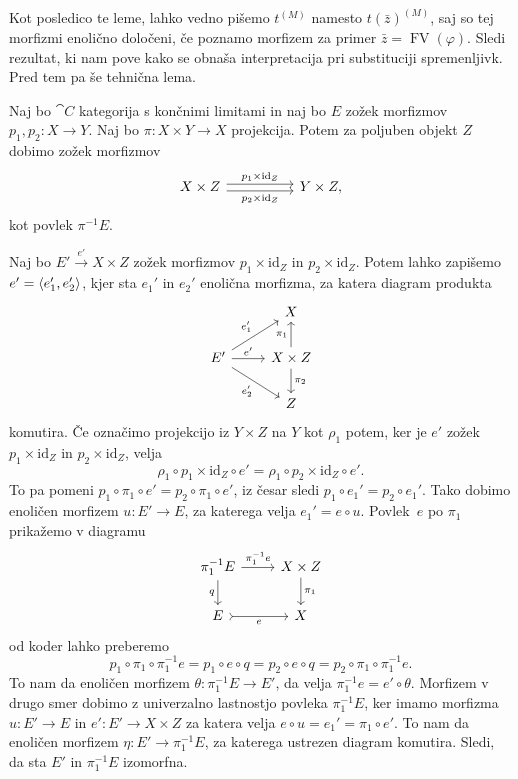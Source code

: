 \documentclass[../kategoricna_logika.tex]{subfiles}
\begin{document}
Kot posledico te leme, lahko vedno pišemo $t^{(M)}$ namesto
$t(\bar{z})^{(M)}$, saj so tej morfizmi enolično določeni, če poznamo
morfizem za primer $\bar{z} = \operatorname{FV}(\varphi)$.  Sledi
rezultat, ki nam pove kako se obnaša interpretacija pri substituciji
spremenljivk. Pred tem pa še tehnična lema.
\begin{lema}\label{lema:zožek-dodatnega-faktorja}
  Naj bo $\cat{C}$ kategorija s končnimi limitami in naj bo $E$ zožek morfizmov
  $p_1, p_2 : X \to Y$. Naj bo $\pi : X \times Y \to X$ projekcija. Potem
  za poljuben objekt $Z$ dobimo zožek morfizmov
  \begin{equation*}
    \begin{tikzcd}[column sep=huge]
      X \times Z  \ar[r, shift left, "p_1 \times \mathrm{id}_Z"]
      \ar[r, shift right, "p_2 \times \mathrm{id}_Z"'] & Y \times Z,
    \end{tikzcd}
  \end{equation*}
  kot povlek $\pi^{-1}E$.
\end{lema}
\begin{dokaz}
  Naj bo $E' \xrightarrow{e'} X \times Z$ zožek morfizmov $p_1 \times \mathrm{id}_Z$ in
  $p_2 \times \mathrm{id}_Z$. Potem lahko zapišemo $e' = \langle e'_1, e'_2 \rangle$,
  kjer sta $e_1'$ in $e_2'$ enolična morfizma, za katera diagram produkta
  \begin{equation*}
    \begin{tikzcd}[row sep = normal]
      & X \\
      E' \ar[ur, "e_1'"] \ar[r, "e'"] \ar[dr, "e_2'"'] & X \times Z
      \ar[u, "\pi_1"] \ar[d, "\pi_2"] \\
      & Z
    \end{tikzcd}
  \end{equation*}
  komutira. Če označimo projekcijo iz $Y \times Z$ na $Y$ kot $\rho_1$ potem,
  ker je $e'$ zožek $p_1 \times \mathrm{id}_Z$ in $p_2 \times \mathrm{id}_Z$,
  velja
  \[ \rho_1 \circ p_1 \times \mathrm{id}_Z \circ e' = \rho_1 \circ p_2 \times \mathrm{id}_Z \circ e'.\]
  To pa pomeni $p_1 \circ \pi_1 \circ e' = p_2 \circ \pi_1 \circ e'$, iz česar sledi
  $p_1 \circ e_1' = p_2 \circ e_1'$. Tako dobimo enoličen morfizem $u : E' \to E$,
  za katerega velja $e_1' = e \circ u$. Povlek~$e$ po $\pi_1$ prikažemo v diagramu
  \begin{equation*}
    \begin{tikzcd}
      \pi_1^{-1}E \ar[d, "q"'] \ar[r, "\pi_1^{-1}e"] & X \times Z \ar[d, "\pi_1"] \\
      E \ar[r, tail, "e"'] & X
    \end{tikzcd}
  \end{equation*}
  od koder lahko preberemo
  \[ p_1 \circ \pi_1 \circ \pi_1^{-1}e = p_1 \circ e \circ q =
    p_2 \circ e \circ q = p_2 \circ \pi_1 \circ \pi_1^{-1}e.\]
  To nam da enoličen morfizem $\theta : \pi_1^{-1}E \to E'$, da velja $\pi_1^{-1}e = e' \circ \theta$.
  Morfizem v drugo smer dobimo z univerzalno lastnostjo povleka $\pi_1^{-1}E$,
  ker imamo morfizma $u : E' \to E$ in $e' : E' \to X \times Z$ za katera velja
  $e \circ u = e_1' = \pi_1 \circ e'$. To nam da enoličen morfizem $\eta : E' \to \pi_1^{-1}E$,
  za katerega ustrezen diagram komutira.
  Sledi, da sta $E'$ in $\pi_1^{-1}E$ izomorfna.
\end{dokaz}
\end{document}

